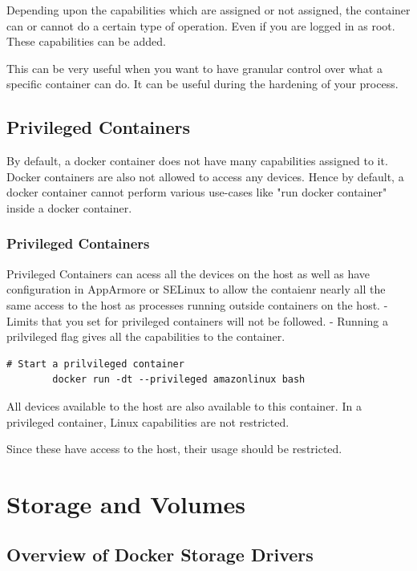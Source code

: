 \documentclass[11pt]{book}
\begin{document}
    Depending upon the capabilities which are assigned or not assigned, the container can or cannot do a certain type of operation.
    Even if you are logged in as root.
    These capabilities can be added.

    This can be very useful when you want to have granular control over what a specific container can do.
    It can be useful during the hardening of your process.

    \section{Privileged Containers}
    By default, a docker container does not have many capabilities assigned to it.
    Docker containers are also not allowed to access any devices.
    Hence by default, a docker container cannot perform various use-cases like "run docker container" inside a docker container.

    \subsection{Privileged Containers}
    Privileged Containers can acess all the devices on the host as well as have configuration in AppArmore or SELinux to allow the contaienr nearly all the same access to the host as processes running outside containers on the host.
    - Limits that you set for privileged containers will not be followed.
    - Running a prilvileged flag gives all the capabilities to the container.

    \begin{lstlisting}[style=terminal]
        # Start a prilvileged container
        docker run -dt --privileged amazonlinux bash
    \end{lstlisting}

    All devices available to the host are also available to this container.
    In a privileged container, Linux capabilities are not restricted.

    Since these have access to the host, their usage should be restricted.


    \chapter{Storage and Volumes}

    \section{Overview of Docker Storage Drivers}
\end{document}
